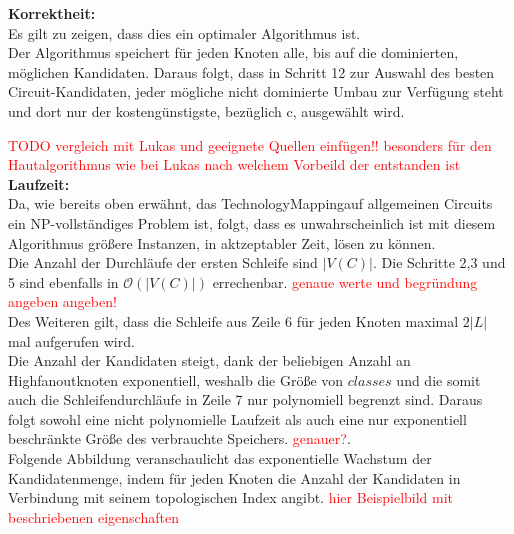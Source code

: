 \documentclass[11pt, a4paper, german]{article}
\newcommand{\TM}{TechnologyMapping}
\begin{document}
{\bf Korrektheit:} \\
Es gilt zu zeigen, dass dies ein optimaler Algorithmus ist. \\
Der Algorithmus speichert für jeden Knoten alle, bis auf die dominierten, möglichen Kandidaten. Daraus folgt, dass in Schritt 12 zur Auswahl des besten Circuit-Kandidaten, jeder mögliche nicht dominierte Umbau zur Verfügung steht und dort nur der kostengünstigste, bezüglich c, ausgewählt wird. 
 
 
 \textcolor{red}{ TODO vergleich mit Lukas und geeignete Quellen einfügen!! besonders für den Hautalgorithmus wie bei Lukas nach welchem Vorbeild der entstanden ist}\\
 
 {\bf Laufzeit:} \\
Da, wie bereits oben erwähnt, das \TM auf allgemeinen Circuits ein NP-vollständiges Problem ist, folgt, dass es unwahrscheinlich ist mit diesem Algorithmus größere Instanzen, in aktzeptabler Zeit, lösen zu können. \\
Die Anzahl der Durchläufe der ersten Schleife sind $|V(C)|$. Die Schritte 2,3 und 5 sind ebenfalls in $\mathcal{O}(|V(C)|)$ errechenbar. \textcolor{red}{genaue werte und begründung angeben angeben!} \\ 
Des Weiteren gilt, dass die Schleife aus Zeile 6 für jeden Knoten maximal $2|L|$ mal aufgerufen wird. \\
Die Anzahl der Kandidaten steigt, dank der beliebigen Anzahl an Highfanoutknoten exponentiell, weshalb die Größe von $classes$ und die somit auch die Schleifendurchläufe in Zeile 7 nur polynomiell begrenzt sind. Daraus folgt sowohl eine nicht polynomielle Laufzeit als auch eine nur exponentiell beschränkte Größe des verbrauchte Speichers. \textcolor{red}{genauer?}.\\

Folgende Abbildung veranschaulicht das exponentielle Wachstum der Kandidatenmenge, indem für jeden Knoten die Anzahl der Kandidaten in Verbindung mit seinem topologischen Index angibt. \textcolor{red}{hier Beispielbild mit beschriebenen eigenschaften} \\
\end{document}
